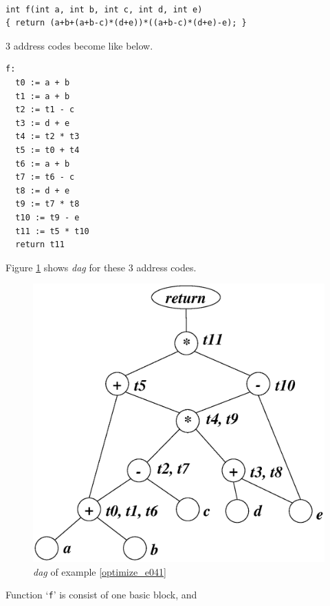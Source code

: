 \begin{Example}
\label{optimize_e041}
\begin{verbatim}

int f(int a, int b, int c, int d, int e)
{ return (a+b+(a+b-c)*(d+e))*((a+b-c)*(d+e)-e); }
\end{verbatim}
3 address codes become like below.
\begin{verbatim}
f:
  t0 := a + b
  t1 := a + b
  t2 := t1 - c
  t3 := d + e
  t4 := t2 * t3
  t5 := t0 + t4
  t6 := a + b
  t7 := t6 - c
  t8 := d + e
  t9 := t7 * t8
  t10 := t9 - e
  t11 := t5 * t10
  return t11
\end{verbatim}
Figure \ref{optimize_e042} shows {\em dag} for these 3 address codes.
\begin{figure}[htbp]
\begin{center}
\includegraphics[width=1.051\linewidth,height=1.0\linewidth]{opt022.eps}
\caption{{\em dag} of example \ref{optimize_e041}}
\label{optimize_e042}
\end{center}
\end{figure}
Function `{\tt{f}}' is consist of one basic block, and 

\end{Example}
